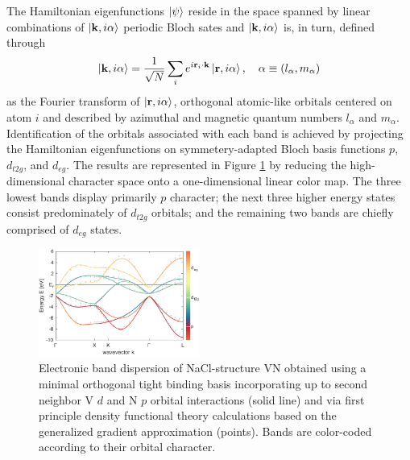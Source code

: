 \documentclass[twocolumn,showpacs,preprintnumbers,superscriptaddress,prb,floatfix,aps,10pt]{revtex4-1}
\renewcommand{\vec}[1]{\ensuremath{\mathbf{#1}}}
\newcommand*{\bloch}{\ket{\vec{k}, i\alpha}}
\newcommand*{\lowdin}{\ket{\vec{r}, i\alpha}}
\begin{document}
The Hamiltonian eigenfunctions $\ket{\psi}$ reside in the space spanned by linear combinations of $\bloch$ periodic Bloch sates and $\bloch$ is, in turn, defined through 
\begin{equation}
\label{eq:bloch}
\bloch = \frac{1}{\sqrt{N}} \sum_i e^{i\vec{r}_i\cdot\vec{k}} \lowdin, 
\quad
\alpha \equiv (l_\alpha,m_\alpha)
\end{equation}
as the Fourier transform of $\lowdin$, orthogonal atomic-like orbitals centered on atom $i$ and described by azimuthal and magnetic quantum numbers $l_\alpha$ and $m_\alpha$. Identification of the orbitals associated with each band is achieved by projecting the Hamiltonian eigenfunctions on symmetery-adapted Bloch basis functions $p$, $d_{t2g}$, and $d_{eg}$. The results are represented in Figure \ref{fig:dispersion} by reducing the high-dimensional character space onto a one-dimensional linear color map. The three lowest bands display primarily $p$ character; the next three higher energy states consist predominately of $d_{t2g}$ orbitals; and the remaining two bands are chiefly comprised of $d_{eg}$ states.
%
\begin{figure}[h]
\includegraphics[width=0.47\textwidth]{Figure_1_bands.pdf}
\caption{\label{fig:dispersion} Electronic band dispersion of NaCl-structure VN obtained using a minimal orthogonal tight binding basis incorporating up to second neighbor V $d$ and N $p$ orbital interactions (solid line) and via first principle density functional theory calculations based on the generalized gradient approximation (points). Bands are color-coded according to their orbital character.}
\end{figure}
\end{document}
